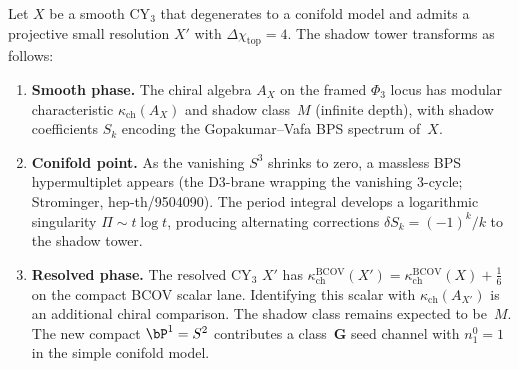 \begin{conjecture}
\label{conj:conifold-shadow-transition}
\ClaimStatusConjectured
Let $X$ be a smooth CY$_3$ that degenerates to a conifold model and admits a projective small resolution $X'$ with \(\Delta\chi_{\mathrm{top}}=4\). The shadow tower transforms as follows:
\begin{enumerate}[label=\textup{(\roman*)}]
 \item \textbf{Smooth phase.} The chiral algebra $A_X$ on the framed
 $\Phi_3$ locus has modular characteristic $\kappa_{\mathrm{ch}}(A_X)$
 and shadow class~$M$ (infinite depth), with shadow coefficients $S_k$
 encoding the Gopakumar--Vafa BPS spectrum of~$X$.
 \item \textbf{Conifold point.} As the vanishing $S^3$ shrinks to zero, a massless BPS hypermultiplet appears (the D3-brane wrapping the vanishing $3$-cycle; Strominger, hep-th/9504090). The period integral develops a logarithmic singularity $\Pi \sim t \log t$, producing alternating corrections $\delta S_k = (-1)^k / k$ to the shadow tower.
 \item \textbf{Resolved phase.} The resolved CY$_3$ $X'$ has
 \(\kappa_{\mathrm{ch}}^{\mathrm{BCOV}}(X') =
 \kappa_{\mathrm{ch}}^{\mathrm{BCOV}}(X) + \frac{1}{6}\) on the compact
 BCOV scalar lane. Identifying this scalar with
 \(\kappa_{\mathrm{ch}}(A_{X'})\) is an additional chiral comparison.
 The shadow class remains expected to be~$M$. The new compact
 \(\bP^1=S^2\) contributes a class~\(\mathbf{G}\) seed channel with
 \(n^0_1=1\) in the simple conifold model.
\end{enumerate}
\end{conjecture}

